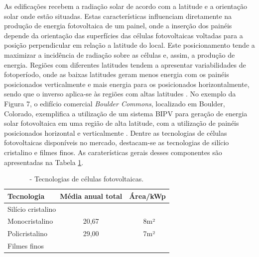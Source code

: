 \begin{onehalfspace}
    \noindent As edificações recebem a radiação solar de acordo com a latitude e a orientação solar onde estão situadas. 
    Estas características influenciam diretamente na produção de energia fotovoltaica de um painel, onde a 
    inserção dos painéis depende da orientação das superfícies das células fotovoltaicas voltadas para a posição 
    perpendicular em relação a latitude do local. Este posicionamento tende a maximizar a incidência de radiação 
    sobre as células e, assim, a produção de energia. Regiões com diferentes latitudes tendem a apresentar 
    variabilidades de fotoperíodo, onde as baixas latitudes geram menos energia com os painéis posicionados 
    verticalmente e mais energia para os posicionados horizontalmente, sendo que o inverso aplica-se às regiões 
    com altas latitudes \cite{Pereira2017}.\vspace{0.3cm} \newline
    No exemplo da Figura 7, o edifício comercial \textit{Boulder Commons}, localizado em Boulder, Colorado, 
    exemplifica a utilização de um sistema BIPV para geração de energia solar fotovoltaica em uma região de 
    alta latitude, com a utilização de painéis posicionados horizontal e verticalmente \cite{AmericanSocietyofHeatingRefrigeratingandAir-ConditioningEngineers-ASHRAE2019,Pereira2017}.
    Dentre as tecnologias de células fotovoltaicas disponíveis no mercado, destacam-se as tecnologias de 
    silício cristalino e filmes finos. As caraterísticas gerais desses componentes são apresentadas na Tabela \ref{tab:tabela1}.
    \begin{table}[ht]\centering
        \caption{\small - Tecnologias de células fotovoltaicas.}
        \vspace*{0.2cm}
        \label{tab:tabela1}
        \begin{tabular}{lcc}
        \hline
        \textbf{Tecnologia}                     & \textbf{Média anual total}    & \textbf{Área/kWp} \\ \hline
        \multicolumn{3}{l||}{Silício cristalino}                                                    \\ \hline
        Monocristalino                          & 20,67                         & ~8m²              \\ \hline
        Policristalino                          & 29,00                         & ~7m²              \\ \hline
        \multicolumn{3}{l||}{Filmes finos}                                                          \\ \hline

\end{tabular}
\end{table}
\end{onehalfspace}
